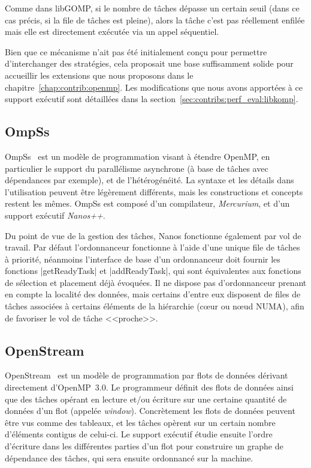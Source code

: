 Comme dans libGOMP, si le nombre de tâches dépasse un certain seuil (dans ce cas précis, si la file de tâches est pleine), alors la tâche c'est pas réellement enfilée mais elle est directement exécutée via un appel séquentiel.

Bien que ce mécanisme n'ait pas été initialement conçu pour permettre d'interchanger des stratégies, cela proposait une base suffisamment solide pour accueillir les extensions que nous proposons dans le chapitre~\ref{chap:contrib:openmp}.
Les modifications que nous avons apportées à ce support exécutif sont détaillées dans la section~\ref{sec:contribs:perf_eval:libkomp}.




\subsection{OmpSs}\label{subsec:rw:ompss}

OmpSs~\cite{OMPSs} est un modèle de programmation visant à étendre OpenMP, en particulier le support du parallélisme asynchrone (à base de tâches avec dépendances par exemple), et de l'hétérogénéité.
La syntaxe et les détails dans l'utilisation peuvent être légèrement différents, mais les constructions et concepts restent les mêmes.
OmpSs est composé d'un compilateur, \emph{Mercurium}, et d'un support exécutif \emph{Nanos++}.

Du point de vue de la gestion des tâches, Nanos fonctionne également par vol de travail.
Par défaut l'ordonnanceur fonctionne à l'aide d'une unique file de tâches à priorité, néanmoins l'interface de base d'un ordonnanceur doit fournir les fonctions |getReadyTask| et |addReadyTask|, qui sont équivalentes aux fonctions de sélection et placement déjà évoquées.
Il ne dispose pas d'ordonnanceur prenant en compte la localité des données, mais certains d'entre eux disposent de files de tâches associées à certains éléments de la hiérarchie (cœur ou nœud NUMA), afin de favoriser le vol de tâche <<proche>>.


\subsection{OpenStream}

OpenStream~\cite{Pop2013} est un modèle de programmation par flots de données dérivant directement d'OpenMP~3.0.
Le programmeur définit des flots de données ainsi que des tâches opérant en lecture et/ou écriture sur une certaine quantité de données d'un flot (appelée \emph{window}).
Concrètement les flots de données peuvent être vus comme des tableaux, et les tâches opèrent sur un certain nombre d'éléments contigus de celui-ci.
Le support exécutif étudie ensuite l'ordre d'écriture dans les différentes parties d'un flot pour construire un graphe de dépendance des tâches, qui sera ensuite ordonnancé sur la machine.

